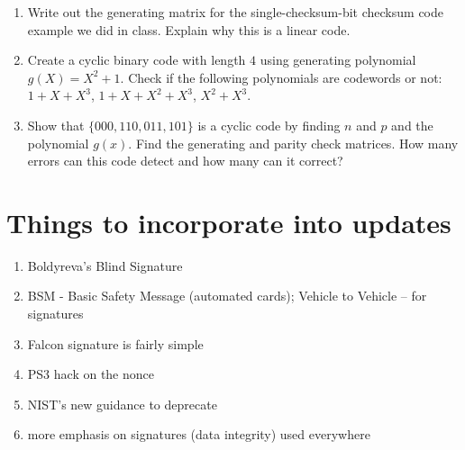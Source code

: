 \documentclass{article}
\theoremstyle{plain}
\theoremstyle{definition}
\theoremstyle{remark}
\numberwithin{theorem}{section}
\begin{document}
\begin{enumerate}
\begin{enumerate}
        \item Choose a codeword, and make an error in one position.  
        \item Then use the parity check matrix to find the syndrome.  
        \item Verify that syndrome decoding would recover the original codeword.
        \item Now make an error in two positions.  What does decoding produce?
        \item What is the minimum distance of a Hamming code (this is just fact check)?
    \end{enumerate}
    \item Write out the generating matrix for the single-checksum-bit checksum code example we did in class.  Explain why this is a linear code.
    \item %
    Create a cyclic binary code with length $4$ using generating polynomial $g(X) = X^2+1$.  Check if the following polynomials are codewords or not:  $1+X+X^3$, $1+X+X^2+X^3$, $X^2+X^3$.
    \item Show that $\{ 000, 110, 011, 101 \}$ is a cyclic code by finding $n$ and $p$ and the polynomial $g(x)$.  Find the generating and parity check matrices.  How many errors can this code detect and how many can it correct?
\end{enumerate}


\section{Things to incorporate into updates}

\begin{enumerate}
    \item Boldyreva's Blind Signature
    \item BSM - Basic Safety Message (automated cards); Vehicle to Vehicle -- for signatures
    \item Falcon signature is fairly simple
    \item PS3 hack on the nonce
    \item NIST's new guidance to deprecate
    \item more emphasis on signatures (data integrity) used everywhere
\end{enumerate}
\end{document}
